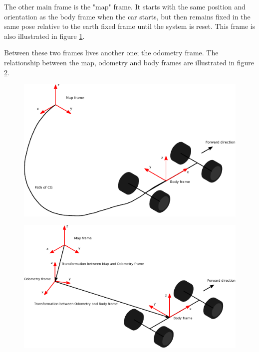 The other main frame is the "map" frame. It starts with the same position and orientation as the body frame when the car starts, but then remains fixed in the same pose relative to the earth fixed frame until the system is reset. This frame is also illustrated in figure \ref{Fig:MapAndBodyFrames}. 

Between these two frames lives another one; the odometry frame. The relationship between the map, odometry and body frames are illustrated in figure \ref{Fig:MapOdomAndBodyFrames}. 

\begin{figure}
    \centering
    \includegraphics[width=0.5\linewidth]{0_Images/2_Introduction/MapAndBodyFrames.pdf}
    \label{Fig:MapAndBodyFrames}
\end{figure}

\begin{figure}
    \centering
    \includegraphics[width=0.5\linewidth]{0_Images/2_Introduction/MapOdomAndBodyFrames.pdf}
    \label{Fig:MapOdomAndBodyFrames}
\end{figure}

